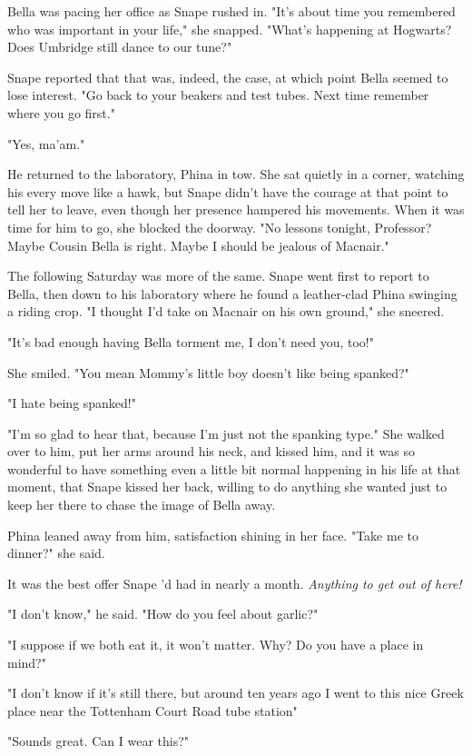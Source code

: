 Bella was pacing her office as Snape rushed in. "It's about time you remembered who was important in your life," she snapped. "What's happening at Hogwarts? Does Umbridge still dance to our tune?"

Snape reported that that was, indeed, the case, at which point Bella seemed to lose interest. "Go back to your beakers and test tubes. Next time remember where you go first."

"Yes, ma'am."

He returned to the laboratory, Phina in tow. She sat quietly in a corner, watching his every move like a hawk, but Snape didn't have the courage at that point to tell her to leave, even though her presence hampered his movements. When it was time for him to go, she blocked the doorway. "No lessons tonight, Professor? Maybe Cousin Bella is right. Maybe I should be jealous of Macnair."

The following Saturday was more of the same. Snape went first to report to Bella, then down to his laboratory where he found a leather-clad Phina swinging a riding crop. "I thought I'd take on Macnair on his own ground," she sneered.

"It's bad enough having Bella torment me, I don't need you, too!"

She smiled. "You mean Mommy's little boy doesn't like being spanked?"

"I hate being spanked!"

"I'm so glad to hear that, because I'm just not the spanking type." She walked over to him, put her arms around his neck, and kissed him, and it was so wonderful to have something even a little bit normal happening in his life at that moment, that Snape kissed her back, willing to do anything she wanted just to keep her there to chase the image of Bella away.

Phina leaned away from him, satisfaction shining in her face. "Take me to dinner?" she said.

It was the best offer Snape 'd had in nearly a month. \emph{Anything to get out of here!}

"I don't know," he said. "How do you feel about garlic?"

"I suppose if we both eat it, it won't matter. Why? Do you have a place in mind?"

"I don't know if it's still there, but around ten years ago I went to this nice Greek place near the Tottenham Court Road tube station{\el}"

"Sounds great. Can I wear this?"

